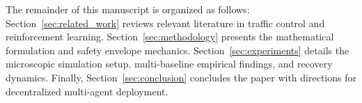 The remainder of this manuscript is organized as follows: Section~\ref{sec:related_work} reviews relevant literature in traffic control and reinforcement learning. Section~\ref{sec:methodology} presents the mathematical formulation and safety envelope mechanics. Section~\ref{sec:experiments} details the microscopic simulation setup, multi-baseline empirical findings, and recovery dynamics. Finally, Section~\ref{sec:conclusion} concludes the paper with directions for decentralized multi-agent deployment.
